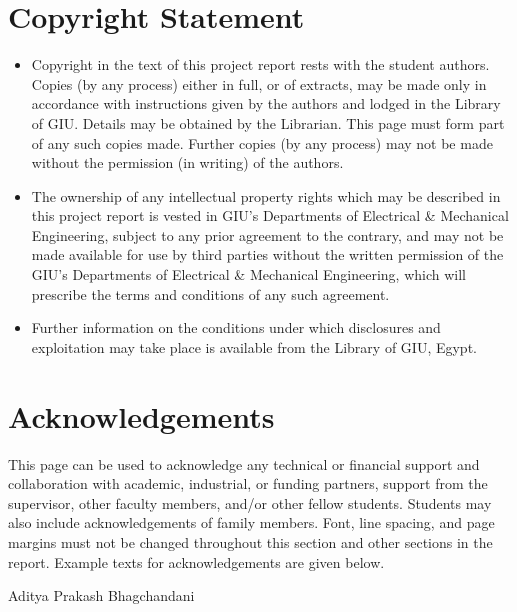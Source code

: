 \documentclass[12pt,a4paper]{report}
\begin{document}
\section*{Copyright Statement}
\begin{itemize}
    \item Copyright in the text of this project report rests with the student authors. Copies (by any process) either in full, or of extracts, may be made only in accordance with instructions given by the authors and lodged in the Library of GIU. Details may be obtained by the Librarian. This page must form part of any such copies made. Further copies (by any process) may not be made without the permission (in writing) of the authors.
    \item The ownership of any intellectual property rights which may be described in this project report is vested in GIU’s Departments of Electrical \& Mechanical Engineering, subject to any prior agreement to the contrary, and may not be made available for use by third parties without the written permission of the GIU’s Departments of Electrical \& Mechanical Engineering, which will prescribe the terms and conditions of any such agreement.
    \item Further information on the conditions under which disclosures and exploitation may take place is available from the Library of GIU, Egypt.
\end{itemize}

\newpage
\section*{Acknowledgements}
This page can be used to acknowledge any technical or financial support and collaboration with academic, industrial, or funding partners, support from the supervisor, other faculty members, and/or other fellow students. Students may also include acknowledgements of family members. Font, line spacing, and page margins must not be changed throughout this section and other sections in the report. Example texts for acknowledgements are given below.

\vspace{2cm}

Aditya Prakash Bhagchandani
\end{document}
